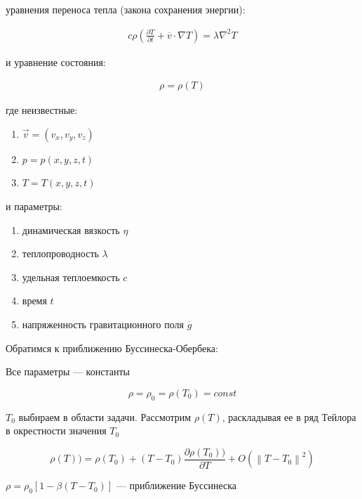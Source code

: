 \documentclass[a4paper, 12pt]{article}
\begin{document}
    уравнения переноса тепла (закона сохранения энергии):

    \begin{equation}
    \begin{gathered}
    \label{f3}
    c \rho(\frac{\partial T}{\partial t} + \overline v \cdot \nabla T) = \lambda \nabla^2 T
    \end{gathered}
    \end{equation}

    и уравнение состояния:

    \begin{equation}
    \begin{gathered}
    \label{f4}
    \rho = \rho (T)
    \end{gathered}
    \end{equation}

    где неизвестные:

    \begin{enumerate}
    \item $ \vec v = (v_x, v_y, v_z)$
    \item $ p = p(x,y,z,t)$
    \item $ T = T(x,y,z,t)$
    \end{enumerate}

    и параметры:

    \begin{enumerate}
    \item динамическая вязкость $\eta$
    \item теплопроводность $\lambda$
    \item удельная теплоемкость $c$
    \item время $t$
    \item напряженность гравитационного поля $\overline g$
    \end{enumerate}

    Обратимся к приближению Буссинеска-Обербека:

    Все параметры --- константы

    $$ \rho = \rho_0 = \rho (T_0) = const $$

    $T_0$ выбираем в области задачи. Рассмотрим $\rho(T)$, раскладывая ее в ряд Тейлора в окрестности значения $T_0$

    $$\rho (T)) = \rho(T_0) + (T - T_0) \frac{\partial \rho(T_0))}{\partial T} + O(\left\lVert T - T_0 \right\rVert ^ 2)$$

    $\rho = \rho_0[1 - \beta(T - T_0)]$ --- приближение Буссинеска
\end{document}
